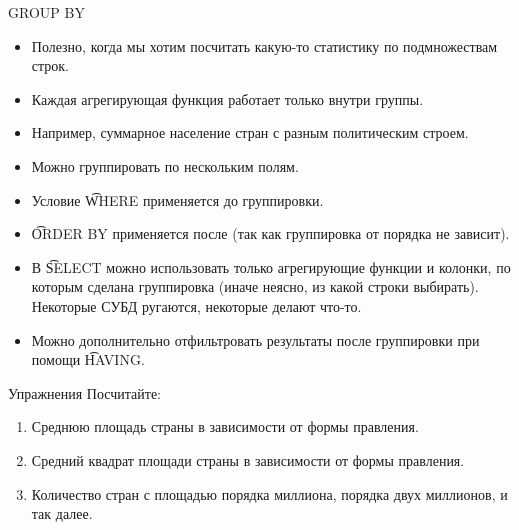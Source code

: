 \begin{frame}{GROUP BY}
	\begin{itemize}
		\item Полезно, когда мы хотим посчитать какую-то статистику по подмножествам строк.
		\item Каждая агрегирующая функция работает только внутри группы.
		\item Например, суммарное население стран с разным политическим строем.
		\item Можно группировать по нескольким полям.
		\item Условие \t{WHERE} применяется до группировки.
		\item \t{ORDER BY} применяется после (так как группировка от порядка не зависит).
		\item В \t{SELECT} можно использовать только агрегирующие функции и колонки, по которым сделана группировка
			(иначе неясно, из какой строки выбирать).
			Некоторые СУБД ругаются, некоторые делают что-то.
		\item Можно дополнительно отфильтровать результаты после группировки при помощи \t{HAVING}.
	\end{itemize}
\end{frame}

\begin{frame}{Упражнения}
	Посчитайте:
	\begin{enumerate}
		\item Среднюю площадь страны в зависимости от формы правления.
		\item Средний квадрат площади страны в зависимости от формы правления.
		\item Количество стран с площадью порядка миллиона, порядка двух миллионов, и так далее.
	\end{enumerate}
\end{frame}
